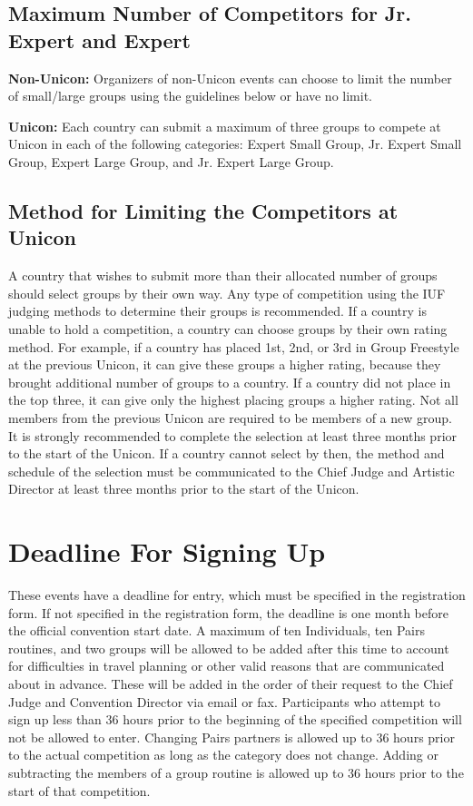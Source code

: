 \subsection{Maximum Number of Competitors for Jr. Expert and Expert}
\textbf{Non-Unicon:} Organizers of non-Unicon events can choose to limit the number of small/large groups using the guidelines below or have no limit.

\textbf{Unicon:} Each country can submit a maximum of three groups to compete at Unicon in each of the following categories: Expert Small Group, Jr. Expert Small Group, Expert Large Group, and Jr. Expert Large Group.

\subsection{Method for Limiting the Competitors at Unicon}
A country that wishes to submit more than their allocated number of groups should select groups by their own way.
Any type of competition using the IUF judging methods to determine their groups is recommended.
If a country is unable to hold a competition, a country can choose groups by their own rating method.
For example, if a country has placed 1st, 2nd, or 3rd in Group Freestyle at the previous Unicon, it can give these groups a higher rating, because they brought additional number of groups to a country.
If a country did not place in the top three, it can give only the highest placing groups a higher rating.
Not all members from the previous Unicon are required to be members of a new group.
It is strongly recommended to complete the selection at least three months prior to the start of the Unicon.
If a country cannot select by then, the method and schedule of the selection must be communicated to the Chief Judge and Artistic Director at least three months prior to the start of the Unicon.

\section{Deadline For Signing Up}
These events have a deadline for entry, which must be specified in the registration form.
If not specified in the registration form, the deadline is one month before the official convention start date.
A maximum of ten Individuals, ten Pairs routines, and two groups will be allowed to be added after this time to account for difficulties in travel planning or other valid reasons that are communicated about in advance.
These will be added in the order of their request to the Chief Judge and Convention Director via email or fax.
Participants who attempt to sign up less than 36 hours prior to the beginning of the specified competition will not be allowed to enter.
Changing Pairs partners is allowed up to 36 hours prior to the actual competition as long as the category does not change.
Adding or subtracting the members of a group routine is allowed up to 36 hours prior to the start of that competition.

